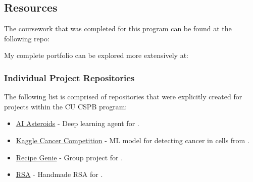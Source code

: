 \subsection{Resources}

The coursework that was completed for this program can be found at the following repo: 

My complete portfolio can be explored more extensively at: 

\subsubsection{Individual Project Repositories}

The following list is comprised of repositories that were explicitly created for projects within the CU CSPB program:

\begin{itemize}
    \item \href{https://github.com/QuantumCompiler/AI-Asteroids}{AI Asteroids} - Deep learning agent for \textbf{\CSPBAI}.
    \item \href{https://github.com/QuantumCompiler/Kaggle-Cancer-Competition}{Kaggle Cancer Competition} - ML model for detecting cancer in cells from \textbf{\CSPBAI}.
    \item \href{https://github.com/QuantumCompiler/Recipe-Genie}{Recipe Genie} - Group project for \textbf{\CSPBSoftDev}.
    \item \href{https://github.com/QuantumCompiler/RSA}{RSA} - Handmade RSA for \textbf{\CSPBDisc}.
\end{itemize}